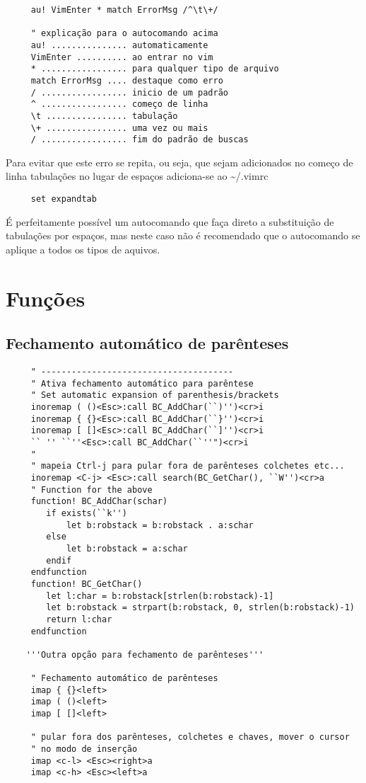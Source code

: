 \begin{verbatim}
     au! VimEnter * match ErrorMsg /^\t\+/

     " explicação para o autocomando acima
     au! ............... automaticamente
     VimEnter .......... ao entrar no vim
     * ................. para qualquer tipo de arquivo
     match ErrorMsg .... destaque como erro
     / ................. inicio de um padrão
     ^ ................. começo de linha
     \t ................ tabulação
     \+ ................ uma vez ou mais
     / ................. fim do padrão de buscas
\end{verbatim}

Para evitar que este erro se repita, ou seja, que sejam 
adicionados no começo de linha tabulações no lugar de espaços
adiciona-se ao \textasciitilde/.vimrc

\begin{verbatim}
     set expandtab
\end{verbatim}

É perfeitamente possível um autocomando que faça direto a substituição de
tabulações por espaços, mas neste caso não é recomendado que o autocomando se
aplique a todos os tipos de aquivos.

\section{Funções}
\label{sec:Funções}

\subsection{Fechamento automático de parênteses}
\label{sec:Fechamento automático de parênteses}

\begin{verbatim}
     " --------------------------------------
     " Ativa fechamento automático para parêntese
     " Set automatic expansion of parenthesis/brackets
     inoremap ( ()<Esc>:call BC_AddChar(``)'')<cr>i
     inoremap { {}<Esc>:call BC_AddChar(``}'')<cr>i
     inoremap [ []<Esc>:call BC_AddChar(``]'')<cr>i
     `` '' ``''<Esc>:call BC_AddChar(``''")<cr>i
     "
     " mapeia Ctrl-j para pular fora de parênteses colchetes etc...
     inoremap <C-j> <Esc>:call search(BC_GetChar(), ``W'')<cr>a
     " Function for the above
     function! BC_AddChar(schar)
        if exists(``k'')
            let b:robstack = b:robstack . a:schar
        else
            let b:robstack = a:schar
        endif
     endfunction
     function! BC_GetChar()
        let l:char = b:robstack[strlen(b:robstack)-1]
        let b:robstack = strpart(b:robstack, 0, strlen(b:robstack)-1)
        return l:char
     endfunction
    
    '''Outra opção para fechamento de parênteses'''
    
     " Fechamento automático de parênteses
     imap { {}<left>
     imap ( ()<left>
     imap [ []<left>
    
     " pular fora dos parênteses, colchetes e chaves, mover o cursor
     " no modo de inserção
     imap <c-l> <Esc><right>a
     imap <c-h> <Esc><left>a
\end{verbatim}

